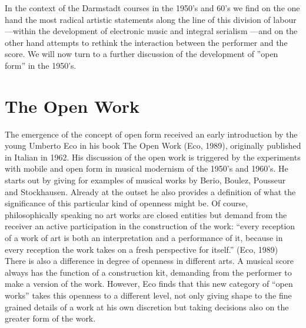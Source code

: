 In the context of the Darmstadt courses in the 1950's and 60's we find
on the one hand the most radical artistic statements along the line of
this division of labour ---within the development of electronic music
and integral serialism ---and on the other hand attempts to rethink
the interaction between the performer and the score. We will now turn
to a further discussion of the development of ''open form'' in the
1950's.
 
\section{The Open Work }
\label{sec:open-work-}

The emergence of the concept of open form received an early
introduction by the young Umberto Eco in his book The Open Work (Eco,
1989), originally published in Italian in 1962.  His discussion of the
open work is triggered by the experiments with mobile and open form in
musical modernism of the 1950's and 1960's. He starts out by giving
for examples of musical works by Berio, Boulez, Pousseur and
Stockhausen. Already at the outset he also provides a definition of
what the significance of this particular kind of openness might be. Of
course, philosophically speaking no art works are closed entities but
demand from the receiver an active participation in the construction
of the work: ``every reception of a work of art is both an
interpretation and a performance of it, because in every reception the
work takes on a fresh perspective for itself.'' (Eco, 1989) There is
also a difference in degree of openness in different arts. A musical
score always has the function of a construction kit, demanding from
the performer to make a version of the work. However, Eco finds that
this new category of ``open works'' takes this openness to a different
level, not only giving shape to the fine grained details of a work at
his own discretion but taking decisions also on the greater form of
the work.
 
